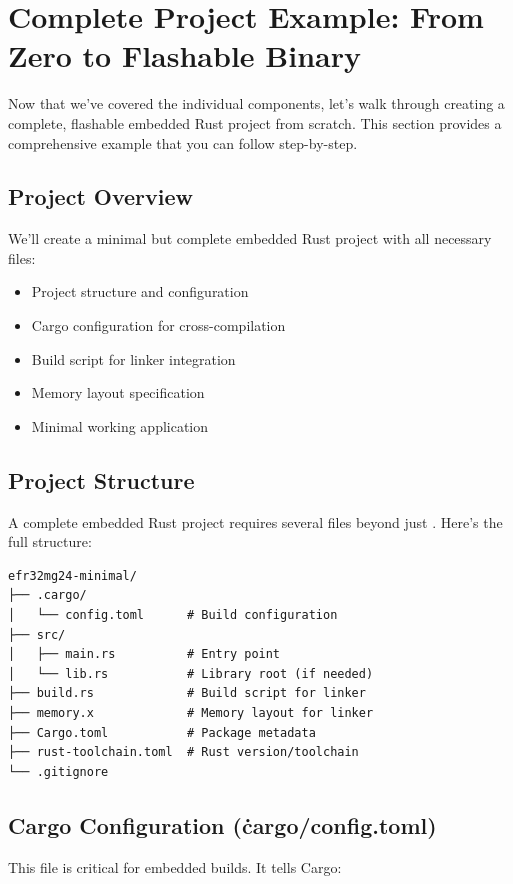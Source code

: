 \section{Complete Project Example: From Zero to Flashable Binary}
\label{sec:complete-project-example}

Now that we've covered the individual components, let's walk through creating a complete, flashable embedded Rust project from scratch. This section provides a comprehensive example that you can follow step-by-step.

\subsection{Project Overview}
\label{subsec:project-overview}

We'll create a minimal but complete embedded Rust project with all necessary files:

\begin{itemize}
    \item Project structure and configuration
    \item Cargo configuration for cross-compilation
    \item Build script for linker integration
    \item Memory layout specification
    \item Minimal working application
\end{itemize}

\subsection{Project Structure}
\label{subsec:project-structure}

A complete embedded Rust project requires several files beyond just . Here's the full structure:

\begin{verbatim}
efr32mg24-minimal/
├── .cargo/
│   └── config.toml      # Build configuration
├── src/
│   ├── main.rs          # Entry point
│   └── lib.rs           # Library root (if needed)
├── build.rs             # Build script for linker
├── memory.x             # Memory layout for linker
├── Cargo.toml           # Package metadata
├── rust-toolchain.toml  # Rust version/toolchain
└── .gitignore
\end{verbatim}
\subsection{Cargo Configuration (\.cargo/config.toml)}
\label{subsec:cargo-config}
This file is critical for embedded builds. It tells Cargo:


